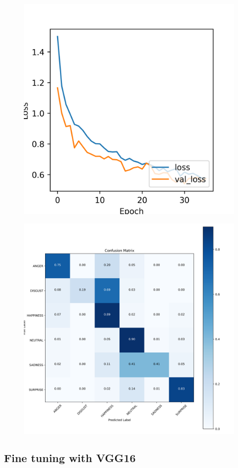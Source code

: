 \begin{figure}[H]
	\centering
	\includegraphics[width=.5\textwidth]{assets/results/preMELD.vgg/vgg16_feature_extract/learning_history-loss.png}
	
	\label{fig:figure13}
\end{figure}

\begin{figure}[H]
	\centering
	\includegraphics[width=.95\textwidth]{assets/results/preMELD.vgg/vgg16_feature_extract/confusion_matrix.png}
	
	\label{fig:cm6}
\end{figure}





\subsection{Fine tuning with VGG16}

